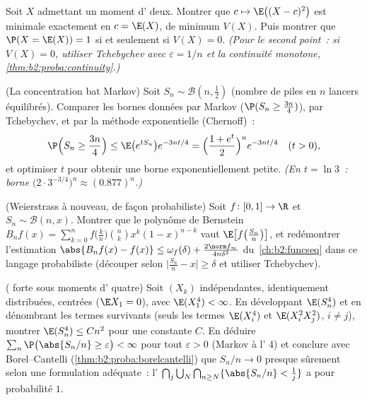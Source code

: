 \begin{exercise}[$\star\star$]\label{exo:b2:randomvar:6}
Soit $X$ admettant un moment d' deux. Montrer que $c \mapsto \E\bigl((X -
c)^2\bigr)$ est minimale exactement en $c = \E(X)$, de minimum
$V(X)$. Puis montrer que $\P(X = \E(X)) = 1$ si et seulement si $V(X) =
0$. \emph{(Pour le second point~: si $V(X) = 0$, utiliser Tchebychev
avec $\varepsilon = 1/n$ et la continuité monotone,
\cref{thm:b2:proba:continuity}.)}
\end{exercise}

\begin{exercise}[$\star\star\star$]\label{exo:b2:randomvar:7}
(La concentration bat Markov) Soit $S_n \sim \mathcal{B}(n,
\frac12)$ (nombre de piles en $n$ lancers équilibrés). Comparer les
bornes données par Markov ($\P(S_n \geq \frac{3n}{4})$), par Tchebychev,
et par la méthode exponentielle (Chernoff)~:
\[
\P\Bigl(S_n \geq \frac{3n}4\Bigr)
\leq \E\bigl(e^{tS_n}\bigr)e^{-3nt/4}
= \Bigl(\frac{1 + e^t}{2}\Bigr)^n e^{-3nt/4}
\quad (t > 0),
\]
et optimiser $t$ pour obtenir une borne exponentiellement petite. \emph{(En
$t = \ln 3$~: borne $\bigl(2\cdot 3^{-3/4}\bigr)^n \approx
(0.877)^n$.)}
\end{exercise}

\begin{exercise}[$\star\star\star$]\label{exo:b2:randomvar:8}
(Weierstrass à nouveau, de façon probabiliste) Soit $f \colon [0,1] \to \R$
 et $S_n \sim \mathcal{B}(n, x)$. Montrer que le
polynôme de Bernstein $B_nf(x) = \sum_{k=0}^n f\bigl(\frac
kn\bigr)\binom nk x^k(1-x)^{n-k}$ vaut
$\E\bigl[f\bigl(\frac{S_n}{n}\bigr)\bigr]$, et redémontrer
l'estimation $\abs{B_nf(x) - f(x)} \leq \omega_f(\delta) +
\frac{2\norm f_\infty}{4n\delta^2}$ du~\cref{ch:b2:funcseq} dans
ce langage probabiliste (découper selon $\bigl|\frac{S_n}{n} -
x\bigr| \geq \delta$ et utiliser Tchebychev).
\end{exercise}

\begin{exercise}[$\star\star\star$]\label{exo:b2:randomvar:9}
( forte sous moments d' quatre) Soit $(X_k)$ indépendantes,
identiquement distribuées, centrées ($\E X_1 = 0$), avec
$\E(X_1^4) < \infty$. En développant $\E(S_n^4)$ et en dénombrant les
termes survivants (seuls les termes $\E(X_i^4)$ et $\E(X_i^2X_j^2)$, $i
\neq j$), montrer $\E(S_n^4) \leq C n^2$ pour une constante $C$. En déduire
$\sum_n \P\bigl(\abs{S_n/n} \geq \varepsilon\bigr) < \infty$
pour tout $\varepsilon > 0$ (Markov à l' 4) et conclure avec
Borel--Cantelli (\cref{thm:b2:proba:borelcantelli}) que
$S_n/n \to 0$ presque sûrement selon une formulation adéquate~: l'
$\bigcap_{j}\bigcup_N\bigcap_{n \geq N}\{\abs{S_n/n} <
\frac1j\}$ a pour probabilité $1$.
\end{exercise}

